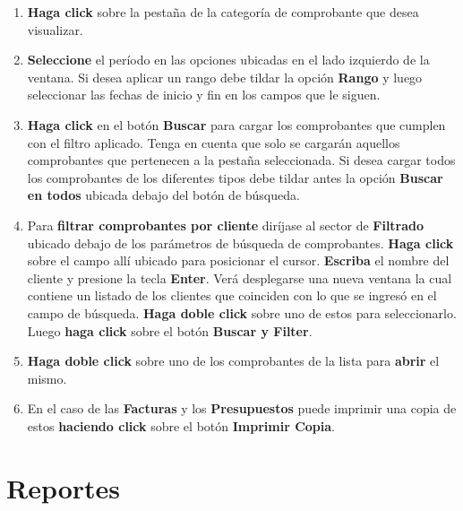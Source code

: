 \documentclass{book}
\begin{document}
\begin{enumerate}
	\itemsep=8pt \topsep=0pt \partopsep=0pt \parskip=0pt \parsep=0pt
	
	\item \textbf{Haga click} sobre la pestaña de la categoría de comprobante que desea visualizar. 

	\item \textbf{Seleccione} el período en las opciones ubicadas en el lado izquierdo de la ventana. Si desea aplicar un rango debe tildar la opción \textbf{Rango} y luego seleccionar las fechas de inicio y fin en los campos que le siguen.

	\item \textbf{Haga click} en el botón \textbf{Buscar} para cargar los comprobantes que cumplen con el filtro aplicado. Tenga en cuenta que solo se cargarán aquellos comprobantes que pertenecen a la pestaña seleccionada. Si desea cargar todos los comprobantes de los diferentes tipos debe tildar antes la opción \textbf{Buscar en todos} ubicada debajo del botón de búsqueda.

	\item Para \textbf{filtrar comprobantes por cliente} diríjase al sector de \textbf{Filtrado} ubicado debajo de los parámetros de búsqueda de comprobantes. \textbf{Haga click} sobre el campo allí ubicado para posicionar el cursor. \textbf{Escriba} el nombre del cliente y presione la tecla \textbf{Enter}. Verá desplegarse una nueva ventana la cual contiene un listado de los clientes que coinciden con lo que se ingresó en el campo de búsqueda. \textbf{Haga  doble click} sobre uno de estos para seleccionarlo. Luego \textbf{haga click} sobre el botón \textbf{Buscar y Filter}.

	\item \textbf{Haga doble click} sobre uno de los comprobantes de la lista para \textbf{abrir} el mismo.

	\item En el caso de las \textbf{Facturas} y los \textbf{Presupuestos} puede imprimir una copia de estos \textbf{haciendo click} sobre el botón \textbf{Imprimir Copia}.

\end{enumerate}
\medskip



\section{Reportes}
\end{document}
